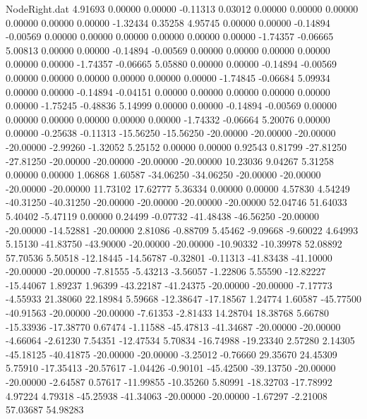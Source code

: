 \begin{filecontents}{NodeRight.dat}
   4.91693    0.00000    0.00000    -0.11313    0.03012    0.00000    0.00000    0.00000    0.00000    0.00000    0.00000   -1.32434    0.35258
   4.95745    0.00000    0.00000    -0.14894   -0.00569    0.00000    0.00000    0.00000    0.00000    0.00000    0.00000   -1.74357   -0.06665
   5.00813    0.00000    0.00000    -0.14894   -0.00569    0.00000    0.00000    0.00000    0.00000    0.00000    0.00000   -1.74357   -0.06665
   5.05880    0.00000    0.00000    -0.14894   -0.00569    0.00000    0.00000    0.00000    0.00000    0.00000    0.00000   -1.74845   -0.06684
   5.09934    0.00000    0.00000    -0.14894   -0.04151    0.00000    0.00000    0.00000    0.00000    0.00000    0.00000   -1.75245   -0.48836
   5.14999    0.00000    0.00000    -0.14894   -0.00569    0.00000    0.00000    0.00000    0.00000    0.00000    0.00000   -1.74332   -0.06664
   5.20076    0.00000    0.00000    -0.25638   -0.11313  -15.56250  -15.56250  -20.00000  -20.00000  -20.00000  -20.00000   -2.99260   -1.32052
   5.25152    0.00000    0.00000     0.92543    0.81799  -27.81250  -27.81250  -20.00000  -20.00000  -20.00000  -20.00000   10.23036    9.04267
   5.31258    0.00000    0.00000     1.06868    1.60587  -34.06250  -34.06250  -20.00000  -20.00000  -20.00000  -20.00000   11.73102   17.62777
   5.36334    0.00000    0.00000     4.57830    4.54249  -40.31250  -40.31250  -20.00000  -20.00000  -20.00000  -20.00000   52.04746   51.64033
   5.40402   -5.47119    0.00000     0.24499   -0.07732  -41.48438  -46.56250  -20.00000  -20.00000  -14.52881  -20.00000    2.81086   -0.88709
   5.45462   -9.09668   -9.60022     4.64993    5.15130  -41.83750  -43.90000  -20.00000  -20.00000  -10.90332  -10.39978   52.08892   57.70536
   5.50518  -12.18445  -14.56787    -0.32801   -0.11313  -41.83438  -41.10000  -20.00000  -20.00000   -7.81555   -5.43213   -3.56057   -1.22806
   5.55590  -12.82227  -15.44067     1.89237    1.96399  -43.22187  -41.24375  -20.00000  -20.00000   -7.17773   -4.55933   21.38060   22.18984
   5.59668  -12.38647  -17.18567     1.24774    1.60587  -45.77500  -40.91563  -20.00000  -20.00000   -7.61353   -2.81433   14.28704   18.38768
   5.66780  -15.33936  -17.38770     0.67474   -1.11588  -45.47813  -41.34687  -20.00000  -20.00000   -4.66064   -2.61230    7.54351  -12.47534
   5.70834  -16.74988  -19.23340     2.57280    2.14305  -45.18125  -40.41875  -20.00000  -20.00000   -3.25012   -0.76660   29.35670   24.45309
   5.75910  -17.35413  -20.57617    -1.04426   -0.90101  -45.42500  -39.13750  -20.00000  -20.00000   -2.64587    0.57617  -11.99855  -10.35260
   5.80991  -18.32703  -17.78992     4.97224    4.79318  -45.25938  -41.34063  -20.00000  -20.00000   -1.67297   -2.21008   57.03687   54.98283

\end{filecontents}
